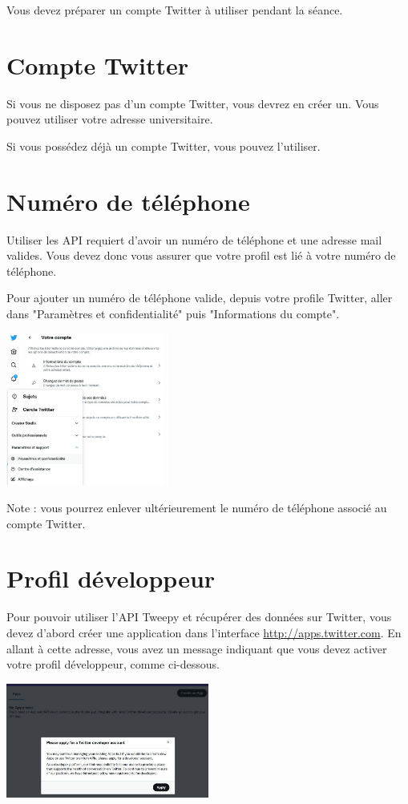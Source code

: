 \documentclass[11pt,a4paper]{article}
\begin{document}
Vous devez préparer un compte Twitter à utiliser pendant la séance. 

\section{Compte Twitter}

Si vous ne disposez pas d'un compte Twitter, vous devrez en créer un. Vous pouvez utiliser votre adresse universitaire.


Si vous possédez déjà un compte Twitter, vous pouvez l'utiliser. 

\section{Numéro de téléphone}
Utiliser les API requiert d'avoir un numéro de téléphone et une adresse mail valides. Vous devez donc vous assurer que votre profil est lié à votre numéro de téléphone. 

Pour ajouter un numéro de téléphone valide, depuis votre profile Twitter, aller dans "Paramètres et confidentialité" puis "Informations du compte".

\begin{center}
    \includegraphics[width=0.4\textwidth]{etapes_cle/step0.jpg}
\end{center}

Note : vous pourrez enlever ultérieurement le numéro de téléphone associé au compte Twitter. 

\newpage
\section{Profil développeur}

Pour pouvoir utiliser l’API Tweepy et récupérer des données sur Twitter, vous devez d'abord créer une application dans l'interface \url{http://apps.twitter.com}.
En allant à cette adresse, vous avez un message indiquant que vous devez activer votre profil développeur, comme ci-dessous. 
\begin{center}
    \includegraphics[width=0.5\textwidth]{etapes_cle/step1.jpg}
\end{center}
\end{document}
